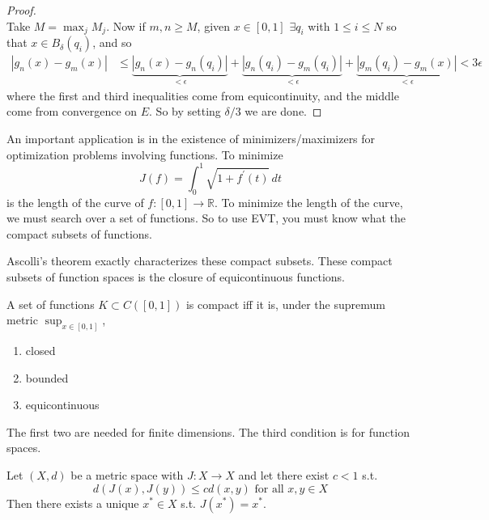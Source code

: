 \begin{proof}
\begin{equation}
    \end{equation}
    Take $M = \max_j M_j$. Now if $m, n \geq M$, given $x \in [0, 1]$ $\exists q_i$ with $1 \leq i \leq N$ so that $x \in B_\delta (q_i)$, and so 
    \begin{align}
      |g_n (x) - g_m (x)| & \leq \underbrace{| g_n (x) - g_n (q_i)|}_{< \epsilon} + \underbrace{| g_n (q_i) - g_m (q_i)|}_{< \epsilon} + \underbrace{|g_m (q_i) - g_m (x)|}_{< \epsilon} < 3\epsilon
    \end{align}
    where the first and third inequalities come from equicontinuity, and the middle come from convergence on $E$. So by setting $\delta/3$ we are done. 
  \end{proof}

  \begin{example}
    An important application is in the existence of minimizers/maximizers for optimization problems involving functions. To minimize 
    \begin{equation}
      J(f) = \int_0^1 \sqrt{1 + f^\prime (t)} \,dt 
    \end{equation}
    is the length of the curve of $f: [0, 1] \to \mathbb{R}$. To minimize the length of the curve, we must search over a set of functions. So to use EVT, you must know what the compact subsets of functions. 
  \end{example}

  Ascolli's theorem exactly characterizes these compact subsets. These compact subsets of function spaces is the closure of equicontinuous functions. 

  \begin{corollary}
    A set of functions $K \subset C([0, 1])$ is compact iff it is, under the supremum metric $\sup_{x \in [0, 1]}$, 
    \begin{enumerate}
      \item closed 
      \item bounded 
      \item equicontinuous
    \end{enumerate}
    The first two are needed for finite dimensions. The third condition is for function spaces. 
  \end{corollary} 

  \begin{theorem}
    Let $(X, d)$ be a metric space with $J: X \to X$ and let there exist $c < 1$ s.t.  
    \begin{equation}
      d(J(x), J(y)) \leq c d(x, y) \text{ for all } x, y \in X
    \end{equation}
    Then there exists a unique $x^\ast \in X$ s.t. $J(x^\ast) = x^\ast$. 
  \end{theorem}


